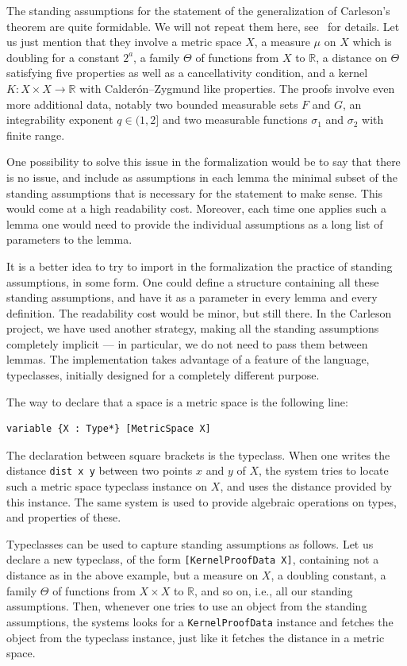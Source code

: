 \documentclass[12pt]{amsart}
\newcommand*{\real}{\mathbb{R}} %
\theoremstyle{definition}
\theoremstyle{plain}
\begin{document}
The standing assumptions for the statement of the generalization of
Carleson's theorem are quite formidable. We will not repeat them here,
see~\cite[Theorem~1.1.1]{CarlesonBlueprint} for details. Let us just mention
that they involve a metric space $X$, a measure $\mu$ on $X$ which is
doubling for a constant $2^a$, a family $\Theta$ of functions from $X$ to
$\real$, a distance on $\Theta$ satisfying five properties as well as a
cancellativity condition, and a kernel $K\colon X \times X \to \real$ with
Calderón--Zygmund like properties. The proofs involve even more additional
data, notably two bounded measurable sets $F$ and $G$, an integrability
exponent $q\in (1, 2]$ and two measurable functions $\sigma_1$ and
$\sigma_2$ with finite range.

One possibility to solve this issue in the formalization would be to say that
there is no issue, and include as assumptions in each lemma the minimal
subset of the standing assumptions that is necessary for the statement to
make sense. This would come at a high readability cost. Moreover, each time
one applies such a lemma one would need to provide the individual assumptions
as a long list of parameters to the lemma.

It is a better idea to try to import in the formalization the practice of
standing assumptions, in some form. One could define a
structure containing all these standing assumptions, and have it as a
parameter in every lemma and every definition. The readability cost would be
minor, but still there. In the Carleson project, we have used another
strategy, making all the standing assumptions completely implicit --- in
particular, we do not need to pass them between lemmas. The implementation
takes advantage of a feature of the language, typeclasses, initially designed
for a completely different purpose.

The way to declare that a space is a metric space is the following line:
\begin{verbatim}
variable {X : Type*} [MetricSpace X]
\end{verbatim}
The declaration between square brackets is the typeclass. When one writes the
distance \texttt{dist x y} between two points $x$ and $y$ of $X$, the system
tries to locate such a metric space typeclass instance on $X$, and uses the distance
provided by this instance. The same system is used to provide algebraic
operations on types, and properties of these.

Typeclasses can be used to capture standing assumptions as follows.
Let us declare a new typeclass, of the form \texttt{[KernelProofData X]},
containing not a distance as in the above example, but a measure on $X$,
a doubling constant, a family $\Theta$ of functions from $X \times X$ to
$\real$, and so on, i.e., all our standing assumptions. Then, whenever one
tries to use an object from the standing assumptions, the systems looks for a
\texttt{KernelProofData} instance and fetches the object from the typeclass
instance, just like it fetches the distance in a metric space.
\end{document}
